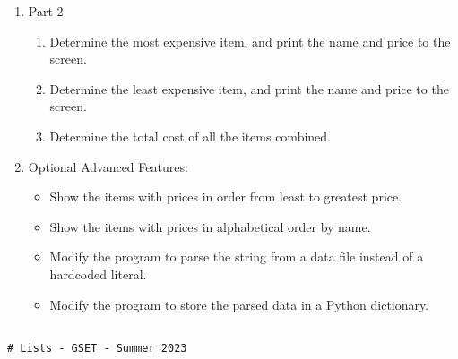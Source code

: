 \documentclass[12pt]{article}
\begin{document}
\begin{description}[labelindent=1cm]
\begin{enumerate}
\begin{enumerate}
		\end{enumerate}	 

	\item Part 2
		\begin{enumerate}

	      \item Determine the most expensive item, and print the name and price to the screen.\\
	      
	      \item Determine the least expensive item, and print the name and price to the screen.\\

	      \item Determine the total cost of all the items combined. \\

		\end{enumerate}	

	\item Optional Advanced Features:
		\begin{itemize}
			
			\item Show the items with prices in order from least to greatest price.\\

			\item Show the items with prices in alphabetical order by name.\\	

			\item Modify the program to parse the string from a data file instead of a hardcoded literal.\\

			\item Modify the program to store the parsed data in a Python dictionary.\\		


		    
		\end{itemize}	

	\end{enumerate}
\newpage

\item[\textbf{\underline{Example Code:}}] \hfill \vspace{0mm}

	\begin{lstlisting}

# Lists - GSET - Summer 2023 
	


\end{lstlisting}
\end{description}
\end{document}
